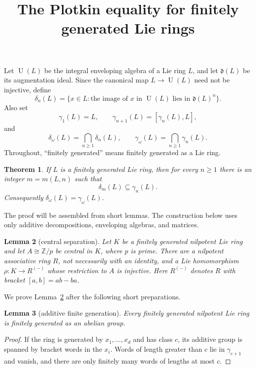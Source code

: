 \documentclass[10pt]{article}
\title{The Plotkin equality for finitely generated Lie rings}
\author{}
\date{}
\newtheorem{lemma}{Lemma}
\newtheorem{theorem}[lemma]{Theorem}
\newcommand{\Z}{\mathbb Z}
\newcommand{\U}{\operatorname U}
\newcommand{\dlt}{\delta}
\newcommand{\gm}{\gamma}
\begin{document}
\maketitle

Let $\U(L)$ be the integral enveloping algebra of a Lie ring $L$, and let
$\mathfrak d(L)$ be its augmentation ideal.  Since the canonical map
$L\to\U(L)$ need not be injective, define
\[
 \dlt_n(L)=\{x\in L:\text{the image of $x$ in $\U(L)$ lies in
                         $\mathfrak d(L)^n$}\}.
\]
Also set
\[
 \gm_1(L)=L,\qquad \gm_{n+1}(L)=[\gm_n(L),L],
\]
and
\[
 \dlt_\omega(L)=\bigcap_{n\ge1}\dlt_n(L),\qquad
 \gm_\omega(L)=\bigcap_{n\ge1}\gm_n(L).
\]
Throughout, ``finitely generated'' means finitely generated as a Lie ring.

\begin{theorem}\label{thm:main}
If $L$ is a finitely generated Lie ring, then for every $n\ge1$ there is an
integer $m=m(L,n)$ such that
\[
                         \dlt_m(L)\subseteq\gm_n(L).   \tag{1}\label{eq:main}
\]
Consequently $\dlt_\omega(L)=\gm_\omega(L)$.
\end{theorem}

The proof will be assembled from short lemmas.  The construction below uses
only additive decompositions, enveloping algebras, and matrices.

\begin{lemma}[central separation]\label{lem:separate}
Let $K$ be a finitely generated nilpotent Lie ring and let
$A\cong\Z/p$ be central in $K$, where $p$ is prime.  There are a nilpotent
associative ring $R$, not necessarily with an identity, and a Lie
homomorphism $\rho:K\to R^{(-)}$ whose restriction to $A$ is injective.
Here $R^{(-)}$ denotes $R$ with bracket $[a,b]=ab-ba$.
\end{lemma}

We prove Lemma~\ref{lem:separate} after the following short preparations.

\begin{lemma}[additive finite generation]\label{lem:additive-finite}
Every finitely generated nilpotent Lie ring is finitely generated as an
abelian group.
\end{lemma}

\begin{proof}
If the ring is generated by $x_1,\ldots,x_d$ and has class $c$, its additive
group is spanned by bracket words in the $x_i$.  Words of length greater
than $c$ lie in $\gm_{c+1}$ and vanish, and there are only finitely many
words of lengths at most $c$.
\end{proof}
\end{document}

